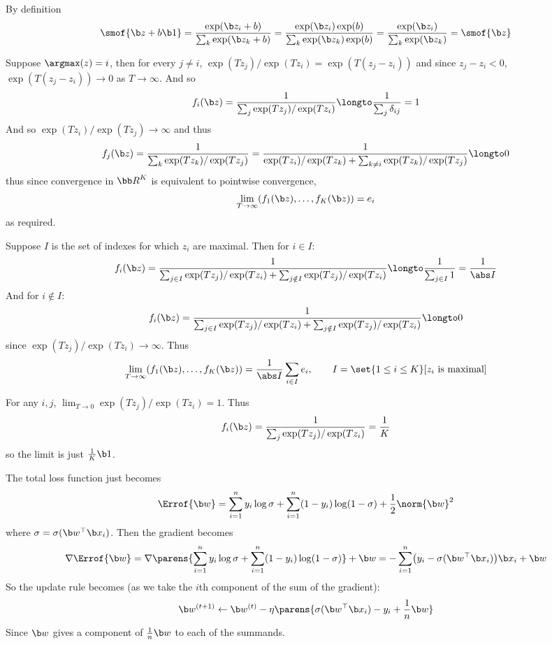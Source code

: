 \benum
    \item By definition
    $$ \smof{\b z+b\b1} = \frac{\exp(\b z_i+b)}{\sum_k\exp(\b z_k+b)} = \frac{\exp(\b z_i)\exp(b)}{\sum_k\exp(\b z_k)\exp(b)} = \frac{\exp(\b z_i)}{\sum_k\exp(\b z_k)} = \smof{\b z} $$
    \item 
    \benum
        \item Suppose $\argmax(z)=i$, then for every $j\neq i$, $\exp(Tz_j)/\exp(Tz_i)=\exp(T(z_j-z_i))$ and since $z_j-z_i<0$, $\exp(T(z_j-z_i))\to0$ as $T\to\infty$.
        And so
        $$ f_i(\b z) = \frac1{\sum_j\exp(Tz_j)/\exp(Tz_i)} \longto \frac1{\sum_j\delta_{ij}} = 1 $$
        And so $\exp(Tz_i)/\exp(Tz_j)\to\infty$ and thus
        $$ f_j(\b z) = \frac1{\sum_k\exp(Tz_k)/\exp(Tz_j)} = \frac1{\exp(Tz_i)/\exp(Tz_k)+\sum_{k\neq i}\exp(Tz_k)/\exp(Tz_j)} \longto 0 $$
        thus since convergence in ${\bb R}^K$ is equivalent to pointwise convergence,
        $$ \lim_{T\to\infty}(f_1(\b z),\dots,f_K(\b z)) = e_i $$
        as required.
        \item Suppose $I$ is the set of indexes for which $z_i$ are maximal.
        Then for $i\in I$:
        $$ f_i(\b z) = \frac1{\sum_{j\in I}\exp(Tz_j)/\exp(Tz_i) + \sum_{j\notin I}\exp(Tz_j)/\exp(Tz_i)} \longto \frac1{\sum_{j\in I}1} = \frac1{\abs I} $$
        And for $i\notin I$:
        $$ f_i(\b z) = \frac1{\sum_{j\in I}\exp(Tz_j)/\exp(Tz_i) + \sum_{j\notin I}\exp(Tz_j)/\exp(Tz_i)} \longto 0 $$
        since $\exp(Tz_j)/\exp(Tz_i)\to\infty$.
        Thus
        $$ \lim_{T\to\infty}(f_1(\b z),\dots,f_K(\b z)) = \frac1{\abs I}\sum_{i\in I}e_i,\qquad I = \set{1\leq i\leq K}[\hbox{$z_i$ is maximal}] $$
        \item For any $i,j$, $\lim_{T\to0}\exp(Tz_j)/\exp(Tz_i)=1$.
        Thus
        $$ f_i(\b z) = \frac1{\sum_j\exp(Tz_j)/\exp(Tz_i)} = \frac1{K} $$
        so the limit is just $\frac1K\b1$.
    \eenum
    \item The total loss function just becomes
    $$ \Errof{\b w} = \sum_{i=1}^ny_i\log\sigma + \sum_{i=1}^n(1-y_i)\log(1-\sigma) + \frac12\norm{\b w}^2 $$
    where $\sigma=\sigma(\b w^\top\b x_i)$.
    Then the gradient becomes
    $$ \nabla\Errof{\b w} = \nabla\parens{\sum_{i=1}^ny_i\log\sigma + \sum_{i=1}^n(1-y_i)\log(1-\sigma)} + \b w = - \sum_{i=1}^n\bigl(y_i-\sigma(\b w^\top\b x_i)\bigr)\b x_i + \b w $$
    So the update rule becomes (as we take the $i$th component of the sum of the gradient):
    $$ \b w^{(t+1)} \gets \b w^{(t)} - \eta\parens{\sigma(\b w^\top\b x_i)-y_i + \frac1n\b w} $$
    Since $\b w$ gives a component of $\frac1n\b w$ to each of the summands.
\eenum

\bye
